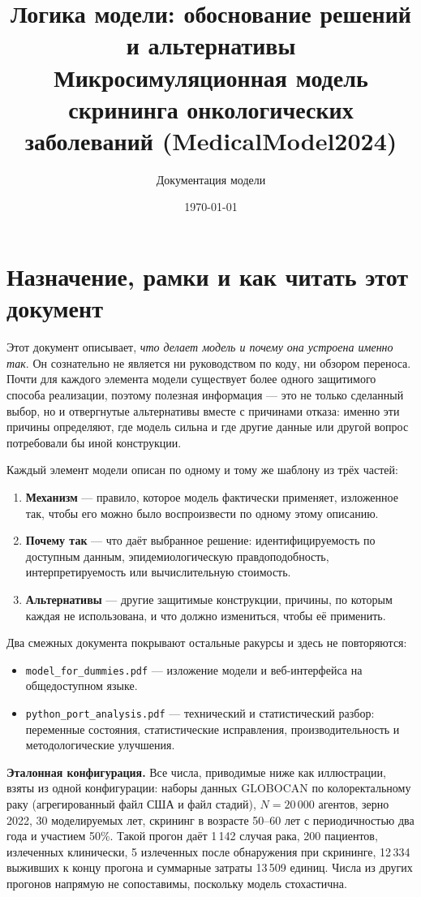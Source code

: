 \documentclass[12pt,a4paper]{article}
\title{Логика модели: обоснование решений и альтернативы\\[0.4em]
\large Микросимуляционная модель скрининга онкологических заболеваний (MedicalModel2024)}
\author{Документация модели}
\date{\today}
\newcommand{\id}[1]{\texttt{#1}}
\begin{document}
\maketitle
\tableofcontents
\newpage

\section{Назначение, рамки и как читать этот документ}

Этот документ описывает, \emph{что делает модель и почему она устроена именно так}. Он сознательно не
является ни руководством по коду, ни обзором переноса. Почти для каждого элемента модели существует более
одного защитимого способа реализации, поэтому полезная информация --- это не только сделанный выбор, но и
отвергнутые альтернативы вместе с причинами отказа: именно эти причины определяют, где модель сильна и где
другие данные или другой вопрос потребовали бы иной конструкции.

Каждый элемент модели описан по одному и тому же шаблону из трёх частей:

\begin{enumerate}[nosep]
  \item \textbf{Механизм} --- правило, которое модель фактически применяет, изложенное так, чтобы его можно
        было воспроизвести по одному этому описанию.
  \item \textbf{Почему так} --- что даёт выбранное решение: идентифицируемость по доступным данным,
        эпидемиологическую правдоподобность, интерпретируемость или вычислительную стоимость.
  \item \textbf{Альтернативы} --- другие защитимые конструкции, причины, по которым каждая не использована,
        и что должно измениться, чтобы её применить.
\end{enumerate}

Два смежных документа покрывают остальные ракурсы и здесь не повторяются:

\begin{itemize}[nosep]
  \item \id{model\_for\_dummies.pdf} --- изложение модели и веб-интерфейса на общедоступном языке.
  \item \id{python\_port\_analysis.pdf} --- технический и статистический разбор: переменные состояния,
        статистические исправления, производительность и методологические улучшения.
\end{itemize}

\textbf{Эталонная конфигурация.} Все числа, приводимые ниже как иллюстрации, взяты из одной конфигурации:
наборы данных GLOBOCAN по колоректальному раку (агрегированный файл США и файл стадий), $N = 20\,000$
агентов, зерно 2022, 30 моделируемых лет, скрининг в возрасте 50--60 лет с периодичностью два года и
участием 50\%. Такой прогон даёт 1\,142 случая рака, 200 пациентов, излеченных клинически, 5 излеченных
после обнаружения при скрининге, 12\,334 выживших к концу прогона и суммарные затраты 13\,509 единиц.
Числа из других прогонов напрямую не сопоставимы, поскольку модель стохастична.
\end{document}
